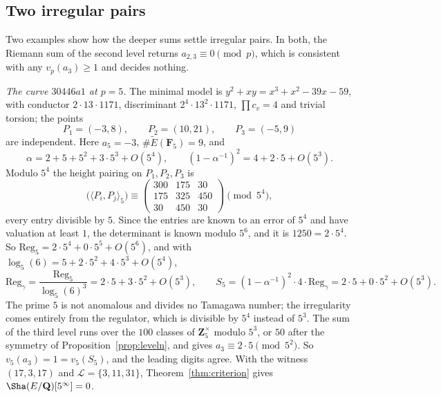 \documentclass[11pt]{amsart}
\theoremstyle{definition}
\newcommand{\Q}{\mathbf{Q}}
\newcommand{\Z}{\mathbf{Z}}
\newcommand{\F}{\mathbf{F}}
\newcommand{\Reg}{\mathrm{Reg}}
\begin{document}
\subsection{Two irregular pairs}\label{ssec:irregex}
Two examples show how the deeper sums settle irregular pairs. In both, the Riemann sum of the second level returns $a_{2,3}\equiv0\pmod p$, which is consistent with any $v_p(a_3)\ge1$ and decides nothing.

\emph{The curve $30446a1$ at $p=5$.} The minimal model is $y^2+xy=x^3+x^2-39x-59$, with conductor $2\cdot13\cdot1171$, discriminant $2^4\cdot13^2\cdot1171$, $\prod c_v=4$ and trivial torsion; the points
\[
P_1=(-3,8),\qquad P_2=(10,21),\qquad P_3=(-5,9)
\]
are independent. Here $a_5=-3$, $\#\tilde E(\F_5)=9$, and
\[
\alpha=2+5+5^2+3\cdot5^3+O(5^4),\qquad(1-\alpha^{-1})^2=4+2\cdot5+O(5^3).
\]
Modulo $5^4$ the height pairing on $P_1,P_2,P_3$ is
\[
\bigl(\langle P_i,P_j\rangle_5\bigr)\equiv\begin{pmatrix}300&175&30\\175&325&450\\30&450&30\end{pmatrix}\pmod{5^4},
\]
every entry divisible by $5$. Since the entries are known to an error of $5^4$ and have valuation at least $1$, the determinant is known modulo $5^6$, and it is $1250=2\cdot5^4$. So $\Reg_5=2\cdot5^4+0\cdot5^5+O(5^6)$, and with $\log_5(6)=5+2\cdot5^2+4\cdot5^3+O(5^4)$,
\[
\Reg_\gamma=\frac{\Reg_5}{\log_5(6)^3}=2\cdot5+3\cdot5^2+O(5^3),\qquad S_5=(1-\alpha^{-1})^2\cdot4\cdot\Reg_\gamma=2\cdot5+0\cdot5^2+O(5^3).
\]
The prime $5$ is not anomalous and divides no Tamagawa number; the irregularity comes entirely from the regulator, which is divisible by $5^4$ instead of $5^3$. The sum of the third level runs over the $100$ classes of $\Z_5^\times$ modulo $5^3$, or $50$ after the symmetry of Proposition~\ref{prop:leveln}, and gives $a_3\equiv2\cdot5\pmod{5^2}$. So $v_5(a_3)=1=v_5(S_5)$, and the leading digits agree. With the witness $(17,3,17)$ and $\mathcal L=\{3,11,31\}$, Theorem~\ref{thm:criterion} gives $\Sha(E/\Q)[5^\infty]=0$.
\end{document}
